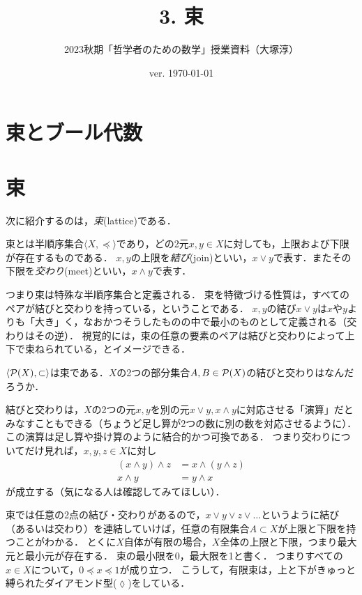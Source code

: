 \documentclass[11pt,a4paper]{jsarticle}
\begin{document}
\title{3. 束}
\author{2023秋期「哲学者のための数学」授業資料（大塚淳）}
\date{ver. \today}
\maketitle

\section{束とブール代数}

\section{束}

次に紹介するのは，\emph{束}(lattice)である．

\begin{dfn}[束]
束とは半順序集合$\langle X, \preceq \rangle$であり，どの2元$x, y \in X$に対しても，上限および下限が存在するものである．
$x, y$の上限を\emph{結び}(join)といい，$x \vee y$で表す．またその下限を\emph{交わり}(meet)といい，$x \wedge y$で表す．
\end{dfn}

つまり束は特殊な半順序集合と定義される．
束を特徴づける性質は，すべてのペアが結びと交わりを持っている，ということである．
$x,y$の結び$x \vee y$は$x$や$y$よりも「大き」く，なおかつそうしたものの中で最小のものとして定義される（交わりはその逆）．
視覚的には，束の任意の要素のペアは結びと交わりによって上下で束ねられている，とイメージできる．

\begin{exercise}
 $\langle \mathcal{P}(X), \subset \rangle$は束である．$X$の2つの部分集合$A, B \in \mathcal{P}(X)$の結びと交わりはなんだろうか．
\end{exercise}

結びと交わりは，$X$の2つの元$x,y$を別の元$x \vee y, x \wedge y$に対応させる「演算」だとみなすこともできる（ちょうど足し算が2つの数に別の数を対応させるように）．
この演算は足し算や掛け算のように結合的かつ可換である．
つまり交わりについてだけ見れば，$x, y, z \in X$に対し
\begin{align}
(x \wedge y) \wedge z &= x \wedge (y \wedge z) \\
x \wedge y &= y \wedge x
\end{align}
が成立する（気になる人は確認してみてほしい）．


束では任意の2点の結び・交わりがあるので，$x \vee y \vee z \vee \dots$というように結び（あるいは交わり）を連結していけば，任意の有限集合$A \subset X$が上限と下限を持つことがわかる．
とくに$X$自体が有限の場合，$X$全体の上限と下限，つまり最大元と最小元が存在する．
束の最小限を0，最大限を1と書く．
つまりすべての$x \in X$について，$0 \preceq x \preceq 1$が成り立つ．
こうして，有限束は，上と下がきゅっと縛られたダイアモンド型($\lozenge$)をしている．
\end{document}
